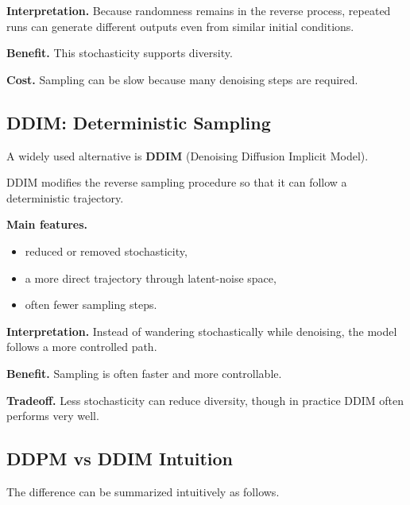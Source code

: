 \medskip

\noindent
\textbf{Interpretation.}
Because randomness remains in the reverse process, repeated runs can generate different outputs even from similar initial conditions.

\medskip

\noindent
\textbf{Benefit.}
This stochasticity supports diversity.

\medskip

\noindent
\textbf{Cost.}
Sampling can be slow because many denoising steps are required.

\subsection{DDIM: Deterministic Sampling}

A widely used alternative is \textbf{DDIM} (Denoising Diffusion Implicit Model).

\medskip

\noindent
DDIM modifies the reverse sampling procedure so that it can follow a deterministic trajectory.

\medskip

\noindent
\textbf{Main features.}
\begin{itemize}
    \item reduced or removed stochasticity,
    \item a more direct trajectory through latent-noise space,
    \item often fewer sampling steps.
\end{itemize}

\medskip

\noindent
\textbf{Interpretation.}
Instead of wandering stochastically while denoising, the model follows a more controlled path.

\medskip

\noindent
\textbf{Benefit.}
Sampling is often faster and more controllable.

\medskip

\noindent
\textbf{Tradeoff.}
Less stochasticity can reduce diversity, though in practice DDIM often performs very well.

\subsection{DDPM vs DDIM Intuition}

The difference can be summarized intuitively as follows.

\medskip

